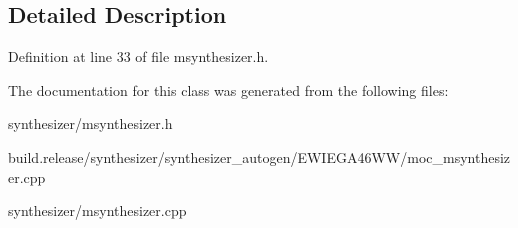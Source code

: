 \subsection{Detailed Description}


Definition at line 33 of file msynthesizer.\+h.



The documentation for this class was generated from the following files\+:\begin{DoxyCompactItemize}
\item 
synthesizer/msynthesizer.\+h\item 
build.\+release/synthesizer/synthesizer\+\_\+autogen/\+E\+W\+I\+E\+G\+A46\+W\+W/moc\+\_\+msynthesizer.\+cpp\item 
synthesizer/msynthesizer.\+cpp\end{DoxyCompactItemize}
